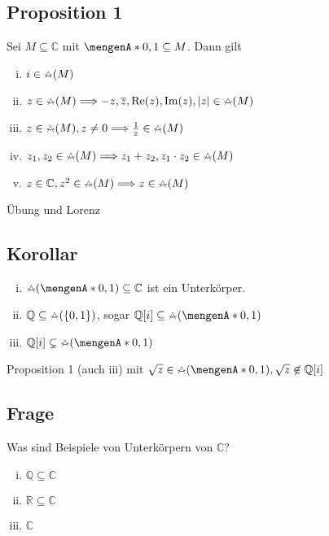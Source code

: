 \subsection[{Proposition 1: Elemente aus $M \subseteq \mathds{C}$, mit $\{0,1\} \subseteq M $}]{Proposition 1} %
\label{sub:105}
Sei $M \subseteq \mathds{C}$ mit $\set{0,1} \subseteq M$. Dann gilt
\begin{enumerate}[i)]
	\item $i \in \zirkel(M)$
	\item $z \in \zirkel(M) \Longrightarrow -z, \overline{z}, \re(z), \im(z), \abs{z} \in \zirkel(M)$
	\item $z \in \zirkel(M), z \not= 0 \Longrightarrow \frac{1}{z} \in \zirkel(M) $
	\item $z_1, z_2 \in \zirkel(M) \Longrightarrow z_1 +z_2, z_1 \cdot z_2 \in \zirkel(M)$
	\item $z \in \mathds{C}, z^2 \in \zirkel(M) \Longrightarrow z \in \zirkel (M)$
\end{enumerate}
Übung und Lorenz

\subsection[Korollar: Die konstruierbaren Zahlen bilden einen Unterkörper von $\mathds{C}$]{Korollar} %
\label{sub:106}
\begin{enumerate}[i)]
	\item $\zirkel (\set{0,1} ) \subseteq \mathds{C}$ ist ein Unterkörper.
	\item $\mathds{Q} \subseteq \zirkel(\{0,1\})$, sogar $\mathds{Q}[i] \subseteq \zirkel(\set{0,1} )$
	\item $\mathds{Q}[i] \subsetneq \zirkel(\set{0,1} ) $
\end{enumerate}
Proposition 1 (auch iii) mit $\sqrt{z} \in \zirkel(\set{0,1}), \sqrt{z} \not\in \mathds{Q}[i]$

\subsection[Frage nach Unterkörpern von $\mathds{C}$]{Frage} %
\label{sub:107}
Was sind Beispiele von Unterkörpern von $\mathds{C}$?
\begin{multicols}{3}
	\begin{enumerate}[(i)]
		\item $\mathds{Q} \subseteq \mathds{C}$
		\item $\mathds{R} \subseteq \mathds{C}$
		\item $\mathds{C}$
	\end{enumerate}
\end{multicols}

